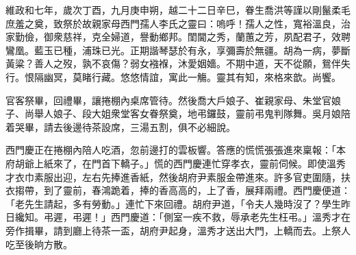 \begin{myquote}[\markfont]
維政和七年，歲次丁酉，九月庚申朔，越二十二日辛巳，眷生喬洪等謹以剛鬣柔毛庶羞之奠，致祭於故親家母西門孺人李氏之靈曰：嗚呼！孺人之性，寬裕溫良，治家勤儉，御衆慈祥，克全婦道，譽動鄉邦。閨閫之秀，蘭蕙之芳，夙配君子，效聘鸞凰。藍玉已種，浦珠已光。正期諧琴瑟於有永，享彌壽於無疆。胡為一病，夢斷黃粱？善人之歿，孰不哀傷？弱女襁褓，沐愛姻嬙。不期中道，天不從願，鴛伴失行。恨隔幽冥，莫睹行藏。悠悠情誼，寓此一觴。靈其有知，來格來歆。尚饗。
\end{myquote} 

官客祭畢，回禮畢，讓捲棚內桌席管待。然後喬大戶娘子、崔親家母、朱堂官娘子、尚舉人娘子、段大姐衆堂客女眷祭奠，地弔鑼鼓，靈前弔鬼判隊舞。吳月娘陪着哭畢，請去後邊待茶設席，三湯五割，俱不必細說。

西門慶正在捲棚內陪人吃酒，忽前邊打的雲板響。答應的慌慌張張進來稟報：「本府胡爺上紙來了，在門首下轎子。」慌的西門慶連忙穿孝衣，靈前伺候。即使溫秀才衣巾素服出迎，左右先捧進香紙，然後胡府尹素服金帶進來。許多官吏圍隨，扶衣搊帶，到了靈前，春鴻跪着，捧的香高高的，上了香，展拜兩禮。西門慶便道：「老先生請起，多有勞動。」連忙下來回禮。胡府尹道，「令夫人幾時沒了？學生昨日纔知。弔遲，弔遲！」西門慶道：「側室一疾不救，辱承老先生枉弔。」溫秀才在旁作揖畢，請到廳上待茶一盃，胡府尹起身，溫秀才送出大門，上轎而去。上祭人吃至後晌方散。

